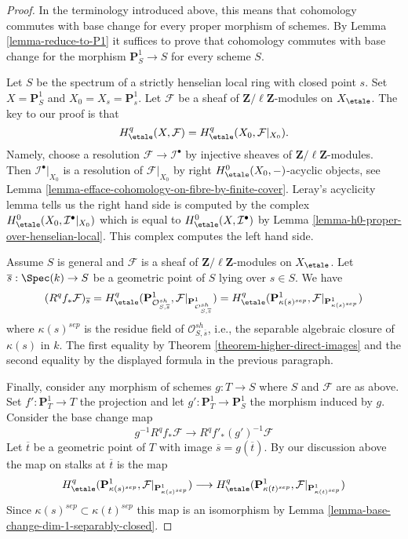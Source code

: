 \begin{proof}
In the terminology introduced above, this means that cohomology commutes
with base change for every proper morphism of schemes. By
Lemma \ref{lemma-reduce-to-P1}
it suffices to prove that cohomology commutes with base change
for the morphism $\mathbf{P}^1_S \to S$ for every scheme $S$.

\medskip\noindent
Let $S$ be the spectrum of a strictly henselian local ring with closed
point $s$. Set $X = \mathbf{P}^1_S$ and $X_0 = X_s = \mathbf{P}^1_s$.
Let $\mathcal{F}$ be a sheaf of $\mathbf{Z}/\ell\mathbf{Z}$-modules
on $X_\etale$. The key to our proof is that
$$
H^q_\etale(X, \mathcal{F}) = H^q_\etale(X_0, \mathcal{F}|_{X_0}).
$$
Namely, choose a resolution $\mathcal{F} \to \mathcal{I}^\bullet$
by injective sheaves of $\mathbf{Z}/\ell\mathbf{Z}$-modules.
Then $\mathcal{I}^\bullet|_{X_0}$ is a resolution of $\mathcal{F}|_{X_0}$
by right $H^0_\etale(X_0, -)$-acyclic objects, see
Lemma \ref{lemma-efface-cohomology-on-fibre-by-finite-cover}.
Leray's acyclicity lemma tells us the right hand side is computed by
the complex $H^0_\etale(X_0, \mathcal{I}^\bullet|_{X_0})$
which is equal to $H^0_\etale(X, \mathcal{I}^\bullet)$ by
Lemma \ref{lemma-h0-proper-over-henselian-local}. This complex
computes the left hand side.

\medskip\noindent
Assume $S$ is general and $\mathcal{F}$ is a sheaf of
$\mathbf{Z}/\ell\mathbf{Z}$-modules on $X_\etale$.
Let $\overline{s} : \Spec(k) \to S$ be a geometric point
of $S$ lying over $s \in S$. We have
$$
(R^qf_*\mathcal{F})_{\overline{s}} =
H^q_\etale(\mathbf{P}^1_{\mathcal{O}_{S, \overline{s}}^{sh}},
\mathcal{F}|_{\mathbf{P}^1_{\mathcal{O}_{S, \overline{s}}^{sh}}}) =
H^q_\etale(\mathbf{P}^1_{\kappa(s)^{sep}},
\mathcal{F}|_{\mathbf{P}^1_{\kappa(s)^{sep}}})
$$
where $\kappa(s)^{sep}$ is the residue field of
$\mathcal{O}_{S, \overline{s}}^{sh}$, i.e., the separable algebraic
closure of $\kappa(s)$ in $k$.
The first equality by Theorem \ref{theorem-higher-direct-images}
and the second equality by the displayed formula in the
previous paragraph.

\medskip\noindent
Finally, consider any morphism of schemes $g : T \to S$ where
$S$ and $\mathcal{F}$ are as above.
Set $f' : \mathbf{P}^1_T \to T$ the projection and let
$g' : \mathbf{P}^1_T \to \mathbf{P}^1_S$ the morphism induced
by $g$. Consider the base change map
$$
g^{-1}R^qf_*\mathcal{F}
\longrightarrow
R^qf'_*(g')^{-1}\mathcal{F}
$$
Let $\overline{t}$ be a geometric point of $T$ with image
$\overline{s} = g(\overline{t})$. By our discussion
above the map on stalks at $\overline{t}$ is the map
$$
H^q_\etale(\mathbf{P}^1_{\kappa(s)^{sep}},
\mathcal{F}|_{\mathbf{P}^1_{\kappa(s)^{sep}}})
\longrightarrow
H^q_\etale(\mathbf{P}^1_{\kappa(t)^{sep}},
\mathcal{F}|_{\mathbf{P}^1_{\kappa(t)^{sep}}})
$$
Since $\kappa(s)^{sep} \subset \kappa(t)^{sep}$ this map is an
isomorphism by Lemma \ref{lemma-base-change-dim-1-separably-closed}.


\end{proof}
